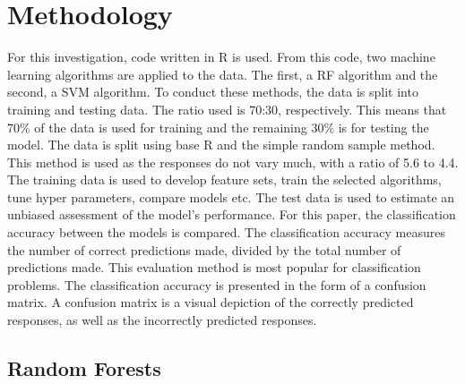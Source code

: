 \documentclass[11pt,preprint, authoryear]{elsarticle}
\numberwithin{equation}{section}
\numberwithin{figure}{section}
\numberwithin{table}{section}
\begin{document}
\hypertarget{methodology}{%
\section{Methodology}\label{methodology}}

For this investigation, code written in R is used. From this code, two
machine learning algorithms are applied to the data. The first, a RF
algorithm and the second, a SVM algorithm. To conduct these methods, the
data is split into training and testing data. The ratio used is 70:30,
respectively. This means that 70\% of the data is used for training and
the remaining 30\% is for testing the model. The data is split using
base R and the simple random sample method. This method is used as the
responses do not vary much, with a ratio of 5.6 to 4.4. The training
data is used to develop feature sets, train the selected algorithms,
tune hyper parameters, compare models etc. The test data is used to
estimate an unbiased assessment of the model's performance. For this
paper, the classification accuracy between the models is compared. The
classification accuracy measures the number of correct predictions made,
divided by the total number of predictions made. This evaluation method
is most popular for classification problems. The classification accuracy
is presented in the form of a confusion matrix. A confusion matrix is a
visual depiction of the correctly predicted responses, as well as the
incorrectly predicted responses.

\hypertarget{random-forests}{%
\subsection{Random Forests}\label{random-forests}}
\end{document}
